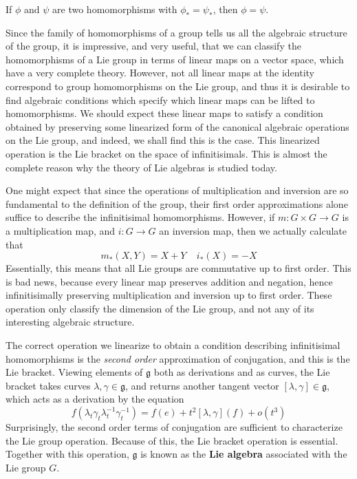 \begin{fact}
    If $\phi$ and $\psi$ are two homomorphisms with $\phi_* = \psi_*$, then $\phi = \psi$.
\end{fact}

Since the family of homomorphisms of a group tells us all the algebraic structure of the group, it is impressive, and very useful, that we can classify the homomorphisms of a Lie group in terms of linear maps on a vector space, which have a very complete theory. However, not all linear maps at the identity correspond to group homomorphisms on the Lie group, and thus it is desirable to find algebraic conditions which specify which linear maps can be lifted to homomorphisms. We should expect these linear maps to satisfy a condition obtained by preserving some linearized form of the canonical algebraic operations on the Lie group, and indeed, we shall find this is the case. This linearized operation is the Lie bracket on the space of infinitisimals. This is almost the complete reason why the theory of Lie algebras is studied today.

One might expect that since the operations of multiplication and inversion are so fundamental to the definition of the group, their first order approximations alone suffice to describe the infinitisimal homomorphisms. However, if $m: G \times G \to G$ is a multiplication map, and $i: G \to G$ an inversion map, then we actually calculate that
%
\[ m_*(X,Y) = X + Y\ \ \ \ \ i_*(X) = -X \]
%
Essentially, this means that all Lie groups are commutative up to first order. This is bad news, because every linear map preserves addition and negation, hence infinitisimally preserving multiplication and inversion up to first order. These operation only classify the dimension of the Lie group, and not any of its interesting algebraic structure.

The correct operation we linearize to obtain a condition describing infinitisimal homomorphisms is the {\it second order} approximation of conjugation, and this is the Lie bracket. Viewing elements of $\mathfrak{g}$ both as derivations and as curves, the Lie bracket takes curves $\lambda, \gamma \in \mathfrak{g}$, and returns another tangent vector $[\lambda, \gamma] \in \mathfrak{g}$, which acts as a derivation by the equation
%
\[ f(\lambda_t \gamma_t \lambda^{-1}_t \gamma^{-1}_t) = f(e) + t^2 [\lambda, \gamma](f) + o(t^3) \]
%
Surprisingly, the second order terms of conjugation are sufficient to characterize the Lie group operation. Because of this, the Lie bracket operation is essential. Together with this operation, $\mathfrak{g}$ is known as the {\bf Lie algebra} associated with the Lie group $G$.

